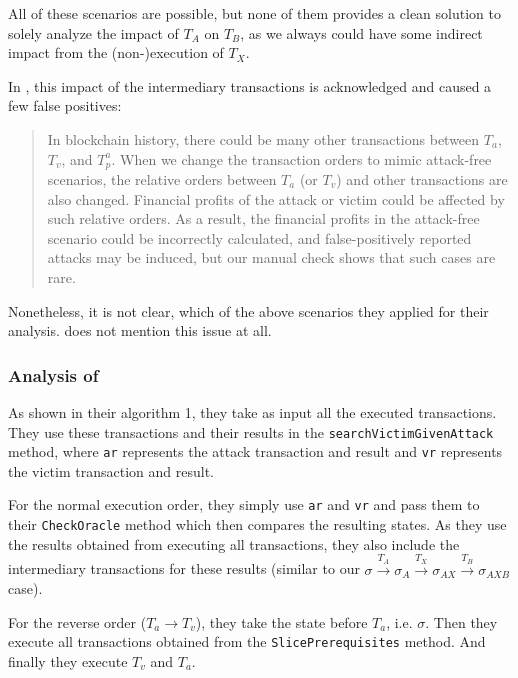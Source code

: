 \documentclass[draft,final]{vutinfth} %
\begin{document}

All of these scenarios are possible, but none of them provides a clean solution to solely analyze the impact of $T_A$ on $T_B$, as we always could have some indirect impact from the (non-)execution of $T_X$.

In \cite{zhang_combatting_2023}, this impact of the intermediary transactions is acknowledged and caused a few false positives:

\begin{quote}
    In blockchain history, there could be many other transactions between $T_a$, $T_v$, and $T_p^a$. When we change the transaction orders to mimic attack-free scenarios, the relative orders between $T_a$ (or $T_v$) and other transactions are also changed. Financial profits of the attack or victim could be affected by such relative orders. As a result, the financial profits in the attack-free scenario could be incorrectly calculated, and false-positively reported attacks may be induced, but our manual check shows that such cases are rare.
\end{quote}

Nonetheless, it is not clear, which of the above scenarios they applied for their analysis. \cite{torres_frontrunner_2021} does not mention this issue at all.


\subsubsection{Analysis of \cite{zhang_combatting_2023}}


As shown in their algorithm 1, they take as input all the executed transactions. They use these transactions and their results in the \verb|searchVictimGivenAttack| method, where \verb|ar| represents the attack transaction and result and \verb|vr| represents the victim transaction and result.

For the normal execution order, they simply use \verb|ar| and \verb|vr| and pass them to their \verb|CheckOracle| method which then compares the resulting states. As they use the results obtained from executing all transactions, they also include the intermediary transactions for these results (similar to our $\sigma \xrightarrow{T_A} \sigma_A \xrightarrow{T_X} \sigma_{AX} \xrightarrow{T_B} \sigma_{AXB}$ case).

For the reverse order ($T_a \rightarrow T_v$), they take the state before $T_a$, i.e. $\sigma$. Then they execute all transactions obtained from the \verb|SlicePrerequisites| method. And finally they execute $T_v$ and $T_a$.
\end{document}
